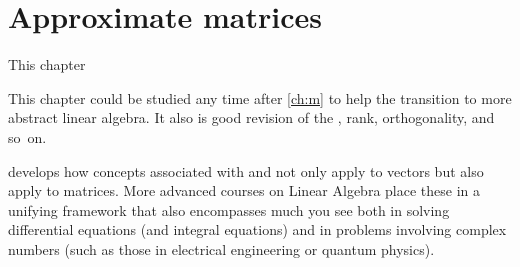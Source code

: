 
\chapter{Approximate matrices}
\label{ch:am}

\minitoc



This chapter 
\begin{aside}
This chapter could be studied any time after \cref{ch:m} to help the transition to more abstract linear algebra.  
It also is good revision of the \svd, rank, orthogonality, and so~on.
\end{aside}%
develops how concepts associated with  and  not only apply to vectors but also apply to matrices.  
More advanced courses on Linear Algebra place these in a unifying framework that also encompasses much you see both in solving differential equations (and integral equations) and in problems involving complex numbers (such as those in electrical engineering or quantum physics). 



\begin{comment} 
Huge applications of \svd{}s to video compression, experimental errors, and other areas.
Introduce digital \idx{image compression} by \svd{}s \pooliv{p.607--8} \holti{p.336--7}  \cite[\S07]{Davis99a}.
\cite{Higham86} mentions applications of \idx{polar decomposition} to the Orthogonal Procrustes problem.
\end{comment}







\endinput

